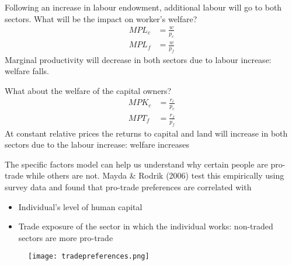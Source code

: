 \documentclass{beamer}
\begin{document}
\begin{frame}
 Following an increase in labour endowment, additional labour will go to both sectors.
 What will be the impact on worker's welfare?
 \begin{align*}
 MPL_c&=\frac{w}{p_c}\\
 MPL_f&=\frac{w}{p_f}
 \end{align*}
 \medskip
 Marginal productivity will decrease in both sectors due to labour increase: welfare falls.
\end{frame}

\begin{frame}
   What about the welfare of the capital owners?
 \begin{align*}
 MPK_c&=\frac{r_c}{p_c}\\
 MPT_f&=\frac{r_f}{p_f}
 \end{align*}
 At constant relative prices the returns to capital and land will increase in both sectors due to the labour increase: welfare increases
\end{frame}

\begin{frame}
 The specific factors model can help us understand why certain people are pro-trade while others are not. 
 Mayda \& Rodrik (2006) test this empirically using survey data and found that pro-trade preferences are correlated with
 \begin{itemize}
   \item Individual's level of human capital
   \item Trade exposure of the sector in which the individual works: non-traded sectors are more pro-trade   
 \end{itemize}
\end{frame}

\begin{frame}
  \begin{figure}
    \texttt{[image: tradepreferences.png]}
  \end{figure}
\end{frame}
\end{document}
